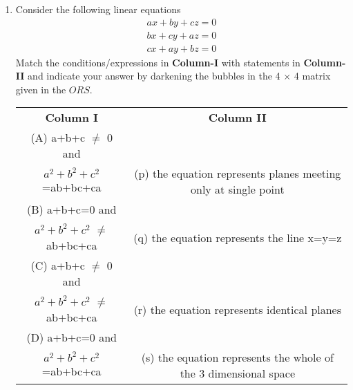 \begin{enumerate}[label=\arabic*.,ref=\thesubsection.\theenumi]
\clearpage
\item Consider the following linear equations
\begin{align*}
ax+by+cz=0
\end{align*}
\begin{align*}
bx+cy+az=0
\end{align*}
\begin{align*}
cx+ay+bz=0
\end{align*}
Match the conditions/expressions in \textbf{Column-I} with statements in \textbf{Column-II} and indicate your answer by darkening the bubbles in the 4 $\times$ 4 matrix given in the $ORS$.
\begin{table}[ht!]
\centering
\begin{tabular}{c c} 
 \textbf{Column I} & \textbf{Column II}\\ [0.5ex] 
 (A) a+b+c $\neq$ 0 and\\
     $a^2+b^2+c^2$=ab+bc+ca                             &(p) the equation represents planes meeting 
                                                             only at single point\\ 
 (B) a+b+c=0 and\\
  $a^2+b^2+c^2$ $\neq$ ab+bc+ca                         &(q) the equation represents the line x=y=z\\
 (C) a+b+c $\neq$ 0 and\\
  $a^2+b^2+c^2$ $\neq$ ab+bc+ca                         &(r) the equation represents identical planes\\
 (D) a+b+c=0 and\\
  $a^2+b^2+c^2$=ab+bc+ca                                &(s) the equation represents the whole of the 
                                                             3 dimensional space\\[1ex] 
\end{tabular}
\end{table}


\end{enumerate}
